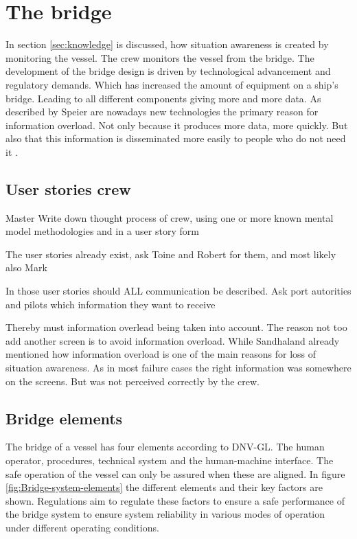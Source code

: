 \chapter{The bridge}
In section \ref{sec:knowledge} is discussed, how situation awareness is created by monitoring the vessel. The crew monitors the vessel from the bridge. The development of the bridge design is driven by technological advancement and regulatory demands. Which has increased the amount of equipment on a ship's bridge. Leading to all different components giving more and more data. As described by Speier are nowadays new technologies the primary reason for information overload. Not only because it produces more data, more quickly. But also that this information is disseminated more easily to people who do not need it \cite{Speier1999}. 

\section{User stories crew}
Master
Write down thought process of crew, using one or more known mental model methodologies and in a user story form

The user stories already exist, ask Toine and Robert for them, and most likely also Mark

In those user stories should ALL communication be described. Ask port autorities and pilots which information they want to receive

Thereby must information overlead being taken into account. The reason not too add another screen is to avoid information overload. While Sandhaland already mentioned how information overload is one of the main reasons for loss of situation awareness. As in most failure cases the right information was somewhere on the screens. But was not perceived correctly by the crew.


\section{Bridge elements}
The bridge of a vessel has four elements according to DNV-GL. The human operator, procedures, technical system and the human-machine interface. The safe operation of the vessel can only be assured when these are aligned. In figure \ref{fig:Bridge-system-elements} the different elements and their key factors are shown. Regulations aim to regulate these factors to ensure a safe performance of the bridge system to ensure system reliability in various modes of operation under different operating conditions. \cite{DNVGL2011}

